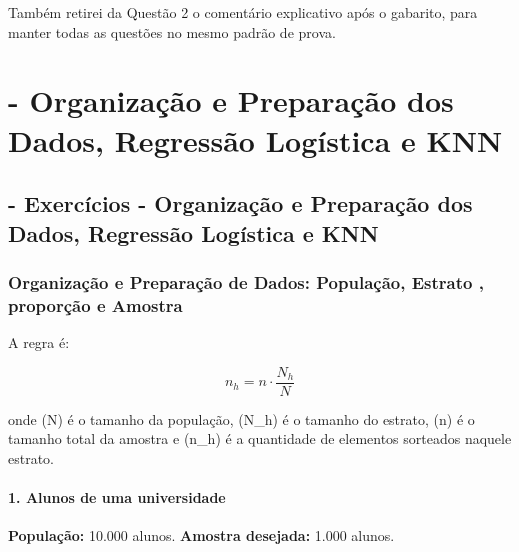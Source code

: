 \documentclass[
]{book}
\begin{document}
Também retirei da Questão 2 o comentário explicativo após o gabarito,
para manter todas as questões no mesmo padrão de prova.

\chapter{- Organização e Preparação dos Dados, Regressão Logística e KNN}\label{organizauxe7uxe3o-e-preparauxe7uxe3o-dos-dados-regressuxe3o-loguxedstica-e-knn}

\section{- Exercícios - Organização e Preparação dos Dados, Regressão Logística e KNN}\label{exercuxedcios---organizauxe7uxe3o-e-preparauxe7uxe3o-dos-dados-regressuxe3o-loguxedstica-e-knn}

\subsection{Organização e Preparação de Dados: População, Estrato , proporção e Amostra}\label{organizauxe7uxe3o-e-preparauxe7uxe3o-de-dados-populauxe7uxe3o-estrato-proporuxe7uxe3o-e-amostra}

A regra é:

\[
n_h = n\cdot\frac{N_h}{N}
\]

onde (N) é o tamanho da população, (N\_h) é o tamanho do estrato, (n) é o tamanho total da amostra e (n\_h) é a quantidade de elementos sorteados naquele estrato.

\subsubsection{1. Alunos de uma universidade}\label{alunos-de-uma-universidade}

\textbf{População:} 10.000 alunos.
\textbf{Amostra desejada:} 1.000 alunos.
\end{document}
